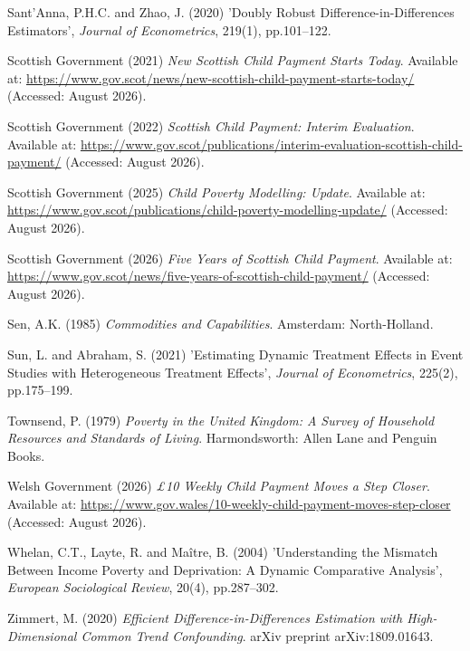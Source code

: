 \noindent\hangindent=1.27cm Sant'Anna, P.H.C. and Zhao, J. (2020) 'Doubly Robust Difference-in-Differences Estimators', \textit{Journal of Econometrics}, 219(1), pp.101--122.
\medskip

\noindent\hangindent=1.27cm Scottish Government (2021) \textit{New Scottish Child Payment Starts Today}. Available at: \url{https://www.gov.scot/news/new-scottish-child-payment-starts-today/} (Accessed: August 2026).
\medskip

\noindent\hangindent=1.27cm Scottish Government (2022) \textit{Scottish Child Payment: Interim Evaluation}. Available at: \url{https://www.gov.scot/publications/interim-evaluation-scottish-child-payment/} (Accessed: August 2026).
\medskip

\noindent\hangindent=1.27cm Scottish Government (2025) \textit{Child Poverty Modelling: Update}. Available at: \url{https://www.gov.scot/publications/child-poverty-modelling-update/} (Accessed: August 2026).
\medskip

\noindent\hangindent=1.27cm Scottish Government (2026) \textit{Five Years of Scottish Child Payment}. Available at: \url{https://www.gov.scot/news/five-years-of-scottish-child-payment/} (Accessed: August 2026).
\medskip

\noindent\hangindent=1.27cm Sen, A.K. (1985) \textit{Commodities and Capabilities}. Amsterdam: North-Holland.
\medskip

\noindent\hangindent=1.27cm Sun, L. and Abraham, S. (2021) 'Estimating Dynamic Treatment Effects in Event Studies with Heterogeneous Treatment Effects', \textit{Journal of Econometrics}, 225(2), pp.175--199.
\medskip

\noindent\hangindent=1.27cm Townsend, P. (1979) \textit{Poverty in the United Kingdom: A Survey of Household Resources and Standards of Living}. Harmondsworth: Allen Lane and Penguin Books.
\medskip

\noindent\hangindent=1.27cm Welsh Government (2026) \textit{\pounds10 Weekly Child Payment Moves a Step Closer}. Available at: \url{https://www.gov.wales/10-weekly-child-payment-moves-step-closer} (Accessed: August 2026).
\medskip

\noindent\hangindent=1.27cm Whelan, C.T., Layte, R. and Ma\^itre, B. (2004) 'Understanding the Mismatch Between Income Poverty and Deprivation: A Dynamic Comparative Analysis', \textit{European Sociological Review}, 20(4), pp.287--302.
\medskip

\noindent\hangindent=1.27cm Zimmert, M. (2020) \textit{Efficient Difference-in-Differences Estimation with High-Dimensional Common Trend Confounding}. arXiv preprint arXiv:1809.01643.
\medskip
